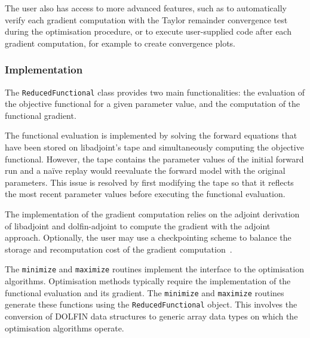 \documentclass[prodmode,acmtoms]{acmsmall}
\newcommand{\dolfin}{{\mbox{DOLFIN}}\xspace}
\newcommand{\da}{\mbox{{dolfin-adjoint}}\xspace}
\newcommand{\libadjoint}{\mbox{{libadjoint}}\xspace}
\begin{document}
The user also has access to more advanced features, such as to automatically verify each gradient computation with the Taylor remainder convergence test
during the optimisation procedure, or 
to execute user-supplied code after each gradient computation, for example to create convergence plots.

\subsubsection{Implementation}


The \texttt{ReducedFunctional} class provides two main functionalities: 
the evaluation of the objective functional for a given parameter value, and the computation of the functional gradient. 

The functional evaluation is implemented by solving the forward equations that have been stored on \libadjoint's tape and simultaneously computing the objective functional. 
However, the tape contains the parameter values of the initial forward run and a na\"{i}ve replay would reevaluate the 
forward model with the original parameters. 
This issue is resolved by first modifying the tape so that it reflects the most recent parameter values before executing the functional evaluation.

The implementation of the gradient computation relies on the adjoint derivation of \libadjoint and \da to compute the gradient with the adjoint approach. 
Optionally, the user may use a checkpointing scheme to balance the storage and recomputation cost of the gradient computation~\cite{griewank1992,farrell2012}.

The \texttt{minimize} and \texttt{maximize} routines implement the interface to the optimisation algorithms. 
Optimisation methods typically require the implementation of the functional evaluation and its gradient. 
The \texttt{minimize} and \texttt{maximize} routines generate these functions using the \texttt{ReducedFunctional} object.
This involves the conversion of \dolfin data structures to generic array data types on which the optimisation algorithms operate. 
\end{document}
